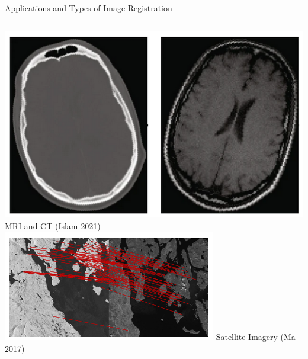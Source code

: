 \documentclass[10pt,xcolor=dvipsnames]{beamer}
\begin{document}
\begin{frame}{Applications and Types of Image Registration}
\begin{columns}
    \begin{column}{0.5 \textwidth}
      \includegraphics[width=\textwidth]{figures/multimodal.png} \small MRI and CT (Islam 2021)
      \includegraphics[width=\textwidth]{figures/landmass.png} \small Satellite Imagery (Ma 2017)
    \end{column}
  \end{columns}
\end{frame}
\end{document}
